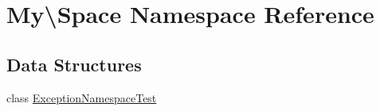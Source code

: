 \hypertarget{namespace_my_1_1_space}{}\section{My\textbackslash{}Space Namespace Reference}
\label{namespace_my_1_1_space}
\subsection*{Data Structures}
\begin{DoxyCompactItemize}
\item 
class \mbox{\hyperlink{class_my_1_1_space_1_1_exception_namespace_test}{Exception\+Namespace\+Test}}
\end{DoxyCompactItemize}
